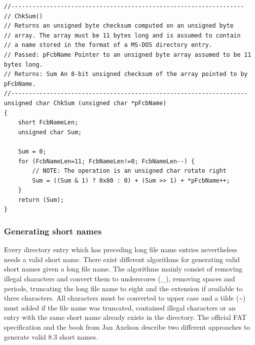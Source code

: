 \lstset{language=c}
\begin{lstlisting}[caption=Calculation of short name checksum \cite{fatgen103}, label=listing:fat_checksum]
//------------------------------------------------------------------
// ChkSum()
// Returns an unsigned byte checksum computed on an unsigned byte
// array. The array must be 11 bytes long and is assumed to contain
// a name stored in the format of a MS-DOS directory entry.
// Passed: pFcbName Pointer to an unsigned byte array assumed to be 11 bytes long.
// Returns: Sum An 8-bit unsigned checksum of the array pointed to by pFcbName.
//-------------------------------------------------------------------
unsigned char ChkSum (unsigned char *pFcbName)
{
    short FcbNameLen;
    unsigned char Sum;
    
    Sum = 0;
    for (FcbNameLen=11; FcbNameLen!=0; FcbNameLen--) {
        // NOTE: The operation is an unsigned char rotate right
        Sum = ((Sum & 1) ? 0x80 : 0) + (Sum >> 1) + *pFcbName++;
    }
    return (Sum);
}
\end{lstlisting}

\subsubsection{Generating short names}

Every directory entry which has preceding long file name entries nevertheless needs a valid short name. There exist different algorithms for generating valid short names given a long file name. The algorithms mainly consist of removing illegal characters and convert them to underscores (\_), removing spaces and periods, truncating the long file name to eight and the extension if available to three characters. All characters must be converted to upper case and a tilde (\textasciitilde) must added if the file name was truncated, contained illegal characters or an entry with the same short name already exists in the directory. The official FAT specification\cite{fatgen103} and the book from Jan Axelson\cite{usb_ms_jan} describe two different approaches to generate valid 8.3 short names.